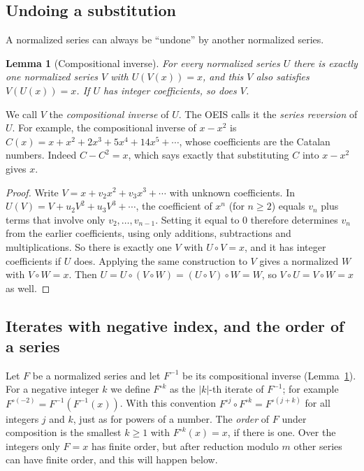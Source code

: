 \documentclass[11pt,a4paper]{article}
\newtheorem{lemma}[theorem]{Lemma}
\theoremstyle{definition}
\theoremstyle{remark}
\begin{document}
\subsection{Undoing a substitution}
A normalized series can always be ``undone'' by another normalized series.

\begin{lemma}[Compositional inverse]\label{lem:inverse}
For every normalized series $U$ there is exactly one normalized series $V$ with $U(V(x))=x$, and this $V$ also
satisfies $V(U(x))=x$. If $U$ has integer coefficients, so does $V$.
\end{lemma}

We call $V$ the \emph{compositional inverse} of $U$. The OEIS calls it the \emph{series reversion} of $U$. For example,
the compositional inverse of $x-x^2$ is $C(x)=x+x^2+2x^3+5x^4+14x^5+\cdots$, whose coefficients are the Catalan numbers.
Indeed $C-C^2=x$, which says exactly that substituting $C$ into $x-x^2$ gives $x$.

\begin{proof}
Write $V=x+v_2x^2+v_3x^3+\cdots$ with unknown coefficients. In
$U(V)=V+u_2V^2+u_3V^3+\cdots$, the coefficient of $x^n$ (for $n\ge2$) equals $v_n$ plus terms that involve only
$v_2,\dots,v_{n-1}$. Setting it equal to $0$ therefore determines $v_n$ from the earlier coefficients, using only
additions, subtractions and multiplications. So there is exactly one $V$ with $U\circ V=x$, and it has integer
coefficients if $U$ does. Applying the same construction to $V$ gives a normalized $W$ with $V\circ W=x$. Then
$U=U\circ(V\circ W)=(U\circ V)\circ W=W$, so $V\circ U=V\circ W=x$ as well.
\end{proof}

\subsection{Iterates with negative index, and the order of a series}
Let $F$ be a normalized series and let $F^{-1}$ be its compositional inverse (Lemma~\ref{lem:inverse}). For a
negative integer $k$ we define $F^{\circ k}$ as the $|k|$-th iterate of $F^{-1}$; for example
$F^{\circ(-2)}=F^{-1}(F^{-1}(x))$. With this convention $F^{\circ j}\circ F^{\circ k}=F^{\circ(j+k)}$ for all integers
$j$ and $k$, just as for powers of a number. The \emph{order} of $F$ under composition is the smallest $k\ge1$ with
$F^{\circ k}(x)=x$, if there is one. Over the integers only $F=x$ has finite order, but after reduction modulo $m$
other series can have finite order, and this will happen below.
\end{document}
